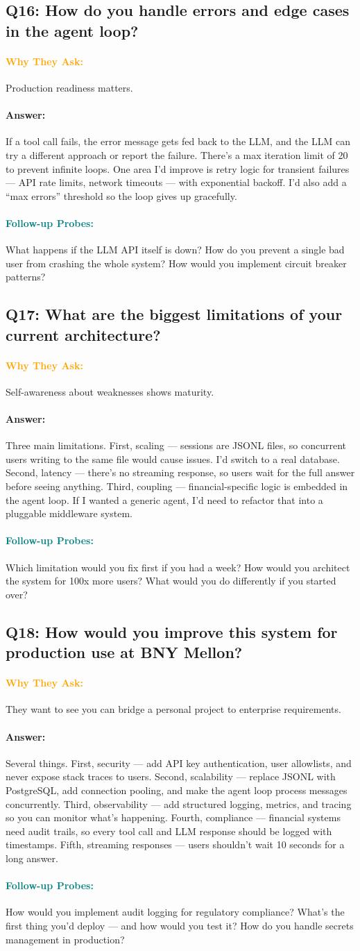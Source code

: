 \documentclass[11pt,a4paper]{article}
\newcommand{\Q}[1]{\subsection{#1}}
\newcommand{\Ans}[1]{\paragraph{\textbf{Answer:}} #1}
\newcommand{\Why}{\paragraph{\textcolor{orange}{\textbf{Why They Ask:}}}}
\newcommand{\Probe}{\paragraph{\textcolor{teal}{\textbf{Follow-up Probes:}}}}
\begin{document}
\Q{Q16: How do you handle errors and edge cases in the agent loop?}
\Why Production readiness matters.
\Ans If a tool call fails, the error message gets fed back to the LLM, and the LLM can try a different approach or report the failure. There's a max iteration limit of 20 to prevent infinite loops. One area I'd improve is retry logic for transient failures --- API rate limits, network timeouts --- with exponential backoff. I'd also add a ``max errors'' threshold so the loop gives up gracefully.
\Probe What happens if the LLM API itself is down? How do you prevent a single bad user from crashing the whole system? How would you implement circuit breaker patterns?

\Q{Q17: What are the biggest limitations of your current architecture?}
\Why Self-awareness about weaknesses shows maturity.
\Ans Three main limitations. First, scaling --- sessions are JSONL files, so concurrent users writing to the same file would cause issues. I'd switch to a real database. Second, latency --- there's no streaming response, so users wait for the full answer before seeing anything. Third, coupling --- financial-specific logic is embedded in the agent loop. If I wanted a generic agent, I'd need to refactor that into a pluggable middleware system.
\Probe Which limitation would you fix first if you had a week? How would you architect the system for 100x more users? What would you do differently if you started over?

\Q{Q18: How would you improve this system for production use at BNY Mellon?}
\Why They want to see you can bridge a personal project to enterprise requirements.
\Ans Several things. First, security --- add API key authentication, user allowlists, and never expose stack traces to users. Second, scalability --- replace JSONL with PostgreSQL, add connection pooling, and make the agent loop process messages concurrently. Third, observability --- add structured logging, metrics, and tracing so you can monitor what's happening. Fourth, compliance --- financial systems need audit trails, so every tool call and LLM response should be logged with timestamps. Fifth, streaming responses --- users shouldn't wait 10 seconds for a long answer.
\Probe How would you implement audit logging for regulatory compliance? What's the first thing you'd deploy --- and how would you test it? How do you handle secrets management in production?
\end{document}
